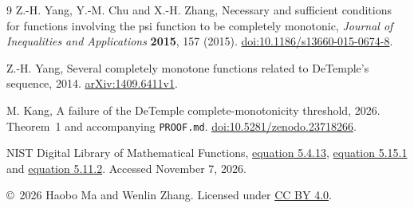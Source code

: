 \documentclass[11pt]{article}
\begin{document}
\begin{thebibliography}{9}
Z.-H. Yang, Y.-M. Chu and X.-H. Zhang,
Necessary and sufficient conditions for functions involving the psi function
to be completely monotonic,
\emph{Journal of Inequalities and Applications} \textbf{2015}, 157 (2015).
\href{https://doi.org/10.1186/s13660-015-0674-8}{doi:10.1186/s13660-015-0674-8}.

Z.-H. Yang, Several completely monotone functions related to DeTemple's
sequence, 2014. \href{https://arxiv.org/abs/1409.6411v1}{arXiv:1409.6411v1}.

M. Kang, A failure of the DeTemple complete-monotonicity threshold,
2026. Theorem~1 and accompanying \texttt{PROOF.md}.
\href{https://doi.org/10.5281/zenodo.23718266}{doi:10.5281/zenodo.23718266}.

NIST Digital Library of Mathematical Functions,
\href{https://dlmf.nist.gov/5.4.E13}{equation 5.4.13},
\href{https://dlmf.nist.gov/5.15.E1}{equation 5.15.1} and
\href{https://dlmf.nist.gov/5.11.E2}{equation 5.11.2}.
Accessed November 7, 2026.
\end{thebibliography}

\smallskip\noindent\small
\copyright\ 2026 Haobo Ma and Wenlin Zhang.
Licensed under \href{https://creativecommons.org/licenses/by/4.0/}{CC BY 4.0}.
\end{document}
